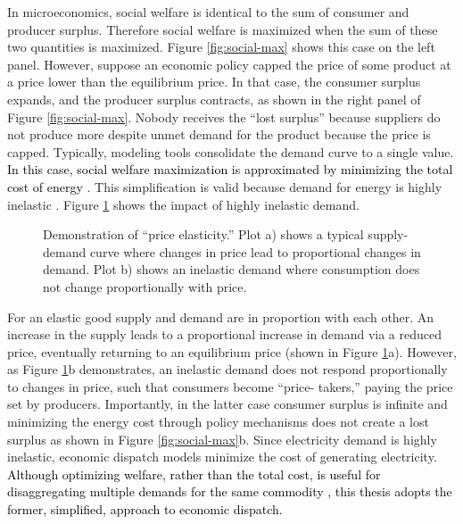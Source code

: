 In microeconomics, social welfare is identical to the sum of consumer and
producer surplus. Therefore social welfare is maximized when the sum of these
two quantities is maximized. Figure \ref{fig:social-max} shows this case on the
left panel. However, suppose an economic policy capped the price of some product
at a price lower than the equilibrium price. In that case, the consumer surplus
expands, and the producer surplus contracts, as shown in the right panel of
Figure \ref{fig:social-max}. Nobody receives the ``lost surplus'' because
suppliers do not produce more despite unmet demand for the product because the
price is capped. Typically, modeling tools consolidate the demand curve to a
single value. \textcolor{black}{In this case, social welfare maximization is
approximated by minimizing the total cost of energy
\cite{richstein_cross-border_2014}}. This simplification is valid because demand
for energy is highly inelastic \cite{heuberger_power_2017, eia_price_2021,
labandeira_meta-analysis_2017, csereklyei_price_2020}. Figure
\ref{fig:inelastic} shows the impact of highly inelastic demand.

\begin{figure}[H]
  \centering
  \resizebox{\columnwidth}{!}{}
  \caption{Demonstration of ``price elasticity.'' Plot a) shows a typical supply-demand curve where changes in price lead to proportional changes in demand. Plot b) shows an inelastic demand where consumption does not change proportionally with price.}
  \label{fig:inelastic}
\end{figure}

For an elastic good supply and demand are in proportion with each other. An
increase in the supply leads to a proportional increase in demand via a reduced
price, eventually returning to an equilibrium price (shown in Figure
\ref{fig:inelastic}a). However, as Figure \ref{fig:inelastic}b demonstrates, an
inelastic demand does not respond proportionally to changes in price, such that
consumers become ``price- takers,'' paying the price set by producers.
Importantly, in the latter case consumer surplus is infinite and minimizing the
energy cost through policy mechanisms does not create a lost surplus as shown in
Figure \ref{fig:social-max}b. Since electricity demand is highly inelastic,
economic dispatch models minimize the cost of generating electricity.
\textcolor{black}{Although optimizing welfare, rather than the total cost, is
useful for disaggregating multiple demands for the same commodity
\cite{leuthold_elmod_2008}, this thesis adopts the former, simplified, approach
to economic dispatch.}

